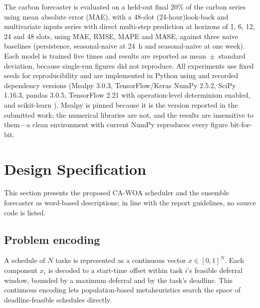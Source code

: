 \documentclass[12pt,a4paper]{article}
\providecommand{\DIFaddtex}[1]{{\protect\color{blue} \sf #1}} %
\providecommand{\DIFdeltex}[1]{{\protect\color{red} \scriptsize #1}} %
\providecommand{\DIFaddbegin}{} %
\providecommand{\DIFaddend}{} %
\providecommand{\DIFdelbegin}{} %
\providecommand{\DIFdelend}{} %
\providecommand{\DIFadd}[1]{\texorpdfstring{\DIFaddtex{#1}}{#1}} %
\providecommand{\DIFdel}[1]{\texorpdfstring{\DIFdeltex{#1}}{}} %
\providecommand{\DIFscaledelfig}{0.5}
\newlength{\DIFdelgraphicswidth} %
\newlength{\DIFdelgraphicsheight} %
\providecommand{\DIFaddincludegraphics}[2][]{{\color{blue}\fbox{\DIFOincludegraphics[#1]{#2}}}} %
\providecommand{\DIFdelincludegraphics}[2][]{%
\sbox{\DIFdelgraphicsbox}{\DIFOincludegraphics[#1]{#2}}%
\settoboxwidth{\DIFdelgraphicswidth}{\DIFdelgraphicsbox} %
\settoboxtotalheight{\DIFdelgraphicsheight}{\DIFdelgraphicsbox} %
\scalebox{\DIFscaledelfig}{%
\parbox[b]{\DIFdelgraphicswidth}{\usebox{\DIFdelgraphicsbox}\\[-\baselineskip] \rule{\DIFdelgraphicswidth}{0em}}\llap{\resizebox{\DIFdelgraphicswidth}{\DIFdelgraphicsheight}{%
\setlength{\unitlength}{\DIFdelgraphicswidth}%
\begin{picture}(1,1)%
\thicklines\linethickness{2pt} %
{\color[rgb]{1,0,0}\put(0,0){\framebox(1,1){}}}%
{\color[rgb]{1,0,0}\put(0,0){\line( 1,1){1}}}%
{\color[rgb]{1,0,0}\put(0,1){\line(1,-1){1}}}%
\end{picture}%
}\hspace*{3pt}}} %
} %
\DeclareRobustCommand{\DIFaddbegin}{\DIFOaddbegin \let\includegraphics\DIFaddincludegraphics} %
\DeclareRobustCommand{\DIFaddend}{\DIFOaddend \let\includegraphics\DIFOincludegraphics} %
\DeclareRobustCommand{\DIFdelbegin}{\DIFOdelbegin \let\includegraphics\DIFdelincludegraphics} %
\DeclareRobustCommand{\DIFdelend}{\DIFOaddend \let\includegraphics\DIFOincludegraphics} %
\begin{document}
\DIFaddend The carbon forecaster is evaluated on a held-out final 20\% of the \DIFdelbegin \DIFdel{carbon series using mean absolute
error (MAE), with a 48-slot (24-hour)look-back and
multivariate inputs}\DIFdelend \DIFaddbegin \DIFadd{series with direct multi-step prediction at
horizons of 1, 6, 12, 24 and 48 slots, using MAE, RMSE, MAPE and MASE, against three naive baselines
(persistence, seasonal-naive at 24~h and seasonal-naive at one week). Each model is trained five times and
results are reported as mean~$\pm$~standard deviation, because single-run figures did not reproduce}\DIFaddend . All
experiments use fixed seeds \DIFdelbegin \DIFdel{for
reproducibility and are implemented in Python using }\DIFdelend \DIFaddbegin \DIFadd{and recorded dependency versions (}\DIFaddend Mealpy 3.0.3, \DIFdelbegin \DIFdel{TensorFlow/Keras }\DIFdelend \DIFaddbegin \DIFadd{NumPy 2.5.2, SciPy 1.16.3,
pandas 3.0.5, TensorFlow 2.21 with operation-level determinism enabled, }\DIFaddend and scikit-learn \DIFaddbegin \DIFadd{1.9). Mealpy is
pinned because it is the version reported in the submitted work; the numerical libraries are not, and the
results are insensitive to them---a clean environment with current NumPy reproduces every figure
bit-for-bit}\DIFaddend .

\section{Design Specification}\label{sec:design}
This section presents the proposed CA-WOA scheduler and the ensemble forecaster as word-based descriptions;
in line with the report guidelines, no source code is listed.

\subsection{Problem encoding}
A schedule of $N$ tasks is represented as a continuous vector $x\in[0,1]^N$. Each component $x_i$ is decoded to
a start-time offset within task $i$'s feasible deferral window, bounded by a maximum deferral and by the task's
deadline. This continuous encoding lets population-based metaheuristics search the space of deadline-feasible
schedules directly.
\end{document}
